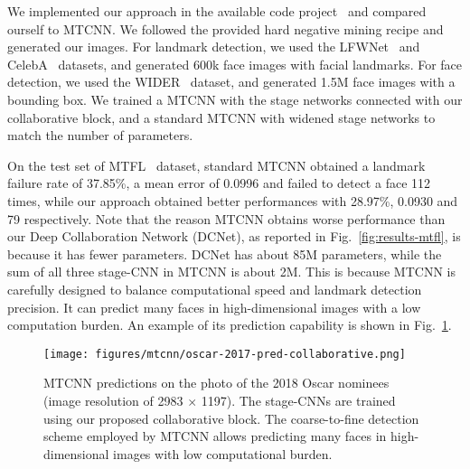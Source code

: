\documentclass[runningheads]{llncs}
\newcommand{\citep}{\cite}
\begin{document}
We implemented our approach in the available code project~\citep{kuaikuaikim2018DFace} and compared ourself to MTCNN. We followed the provided hard negative mining recipe and generated our images. For landmark detection, we used the LFWNet~\citep{sun2013deep} and CelebA~\citep{liu2015faceattributes} datasets, and generated 600k face images with facial landmarks. For face detection, we used the WIDER~\citep{yang2016wider} dataset, and generated 1.5M face images with a bounding box. We trained a MTCNN with the stage networks connected with our collaborative block, and a standard MTCNN with widened stage networks to match the number of parameters.

On the test set of MTFL~\citep{zhang2014facial} dataset, standard MTCNN obtained a landmark failure rate of 37.85\%, a mean error of 0.0996 and failed to detect a face 112 times, while our approach obtained better performances with 28.97\%, 0.0930 and 79 respectively. Note that the reason MTCNN obtains worse performance than our Deep Collaboration Network (DCNet), as reported in Fig.~\ref{fig:results-mtfl}, is because it has fewer parameters. DCNet has about 85M parameters, while the sum of all three stage-CNN in MTCNN is about 2M. This is because MTCNN is carefully designed to balance computational speed and landmark detection precision. It can predict many faces in high-dimensional images with a low computation burden. An example of its prediction capability is shown in Fig.~\ref{fig:oscar-2017predcollaborative}.


\begin{figure}[t]
    \centering
    \texttt{[image: figures/mtcnn/oscar-2017-pred-collaborative.png]}
    \caption{MTCNN predictions on the photo of the 2018 Oscar nominees (image resolution of 2983 $\times$ 1197). The stage-CNNs are trained using our proposed collaborative block. The coarse-to-fine detection scheme employed by MTCNN allows predicting many faces in high-dimensional images with low computational burden.}
    \label{fig:oscar-2017predcollaborative}
\end{figure}
\end{document}
